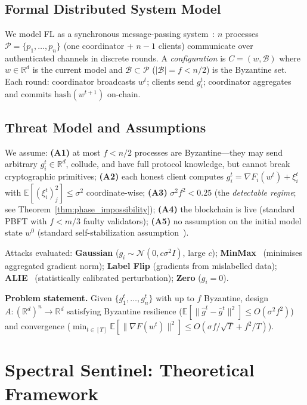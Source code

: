 \documentclass[runningheads]{llncs}
\begin{document}
\subsection{Formal Distributed System Model}
\label{sec:dist_model}

We model FL as a synchronous message-passing system~\cite{byzantine_generals}: $n$ processes $\mathcal{P}=\{p_1,\ldots,p_n\}$ (one coordinator + $n-1$ clients) communicate over authenticated channels in discrete rounds. A \emph{configuration} is $C=(w,\mathcal{B})$ where $w\in\mathbb{R}^d$ is the current model and $\mathcal{B}\subset\mathcal{P}$ ($|\mathcal{B}|=f<n/2$) is the Byzantine set. Each round: coordinator broadcasts $w^t$; clients send $g_i^t$; coordinator aggregates and commits $\mathrm{hash}(w^{t+1})$ on-chain.

\subsection{Threat Model and Assumptions}
\label{sec:threat_model}

We assume: \textbf{(A1)} at most $f < n/2$ processes are Byzantine---they may send arbitrary $g_i^t \in \mathbb{R}^d$, collude, and have full protocol knowledge, but cannot break cryptographic primitives; \textbf{(A2)} each honest client computes $g_i^t = \nabla F_i(w^t) + \xi_i^t$ with $\mathbb{E}[(\xi_i^t)_j^2] \leq \sigma^2$ coordinate-wise; \textbf{(A3)} $\sigma^2 f^2 < 0.25$ (the \emph{detectable regime}; see Theorem~\ref{thm:phase_impossibility}); \textbf{(A4)} the blockchain is live (standard PBFT with $f < m/3$ faulty validators); \textbf{(A5)} no assumption on the initial model state $w^0$ (standard self-stabilization assumption~\cite{dijkstra_self_stab}).

Attacks evaluated: \textbf{Gaussian} ($g_i \sim \mathcal{N}(0, c\sigma^2 I)$, large $c$); \textbf{MinMax}~\cite{fl_poisoning} (minimises aggregated gradient norm); \textbf{Label Flip} (gradients from mislabelled data); \textbf{ALIE}~\cite{alie_attack} (statistically calibrated perturbation); \textbf{Zero} ($g_i = 0$).

\noindent\textbf{Problem statement.} Given $\{g_1^t,\ldots,g_n^t\}$ with up to $f$ Byzantine, design $A:(\mathbb{R}^d)^n \to \mathbb{R}^d$ satisfying Byzantine resilience ($\mathbb{E}[\|\hat{g}^t - \bar{g}^t\|^2] \leq O(\sigma^2 f^2)$) and convergence ($\min_{t \in [T]} \mathbb{E}[\|\nabla F(w^t)\|^2] \leq O(\sigma f/\sqrt{T} + f^2/T)$).

\section{Spectral Sentinel: Theoretical Framework}
\end{document}
